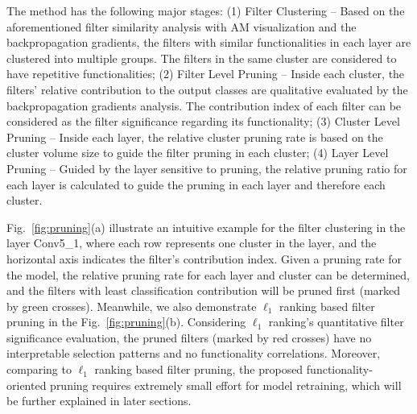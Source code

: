 \documentclass{article} %
\begin{document}
The method has the following major stages:
	(1) Filter Clustering -- Based on the aforementioned filter similarity analysis with AM visualization and the backpropagation gradients, the filters with similar functionalities in each layer are clustered into multiple groups.
	The filters in the same cluster are considered to have repetitive functionalities;
	(2) Filter Level Pruning -- Inside each cluster, the filters' relative contribution to the output classes are qualitative evaluated by the backpropagation gradients analysis.
	The contribution index of each filter can be considered as the filter significance regarding its functionality;
	(3) Cluster Level Pruning -- Inside each layer, the relative cluster pruning rate is based on the cluster volume size to guide the filter pruning in each cluster;
	(4) Layer Level Pruning --  Guided by the layer sensitive to pruning, the relative pruning ratio for each layer is calculated to guide the pruning in each layer and therefore each cluster.

Fig.~\ref{fig:pruning}(a) illustrate an intuitive example for the filter clustering in the layer Conv5\_1, where each row represents one cluster in the layer, and the horizontal axis indicates the filter's contribution index.
	Given a pruning rate for the model, the relative pruning rate for each layer and cluster can be determined, and the filters with least classification contribution will be pruned first (marked by green crosses).
Meanwhile, we also demonstrate $\ell_1$ ranking based filter pruning in the Fig.~\ref{fig:pruning}(b).
	Considering $\ell_1$ ranking's quantitative filter significance evaluation, the pruned filters (marked by red crosses) have no interpretable selection patterns and no functionality correlations.
	Moreover, comparing to $\ell_1$ ranking based filter pruning, the proposed functionality-oriented pruning requires extremely small effort for model retraining, which will be further explained in later sections.
\end{document}
